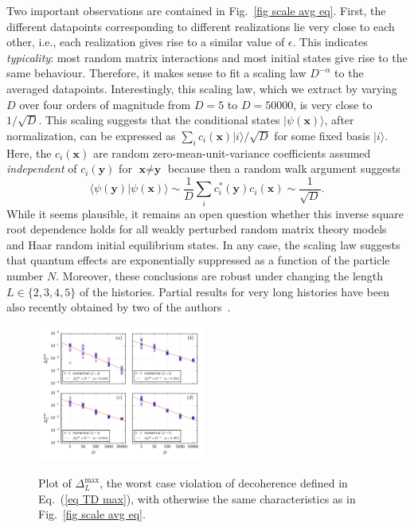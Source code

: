 \documentclass[pre,onecolumn,12pt,aps,longbibliography,nofootinbib]{revtex4-2}
\newcommand{\bb}[1]{\textbf{#1}}
\newcommand{\lr}[1]{{\langle {#1}\rangle}}
\newcommand{\new}[1]{#1}
\begin{document}
Two important observations are contained in Fig.~\ref{fig scale avg eq}. First, the different datapoints corresponding to different realizations lie very close to each other, i.e., each realization gives rise to a similar value of $\epsilon$. This indicates \emph{typicality}: most random matrix interactions and most initial states give rise to the same behaviour. Therefore, it makes sense to fit a scaling law $D^{-\alpha}$ to the averaged datapoints. Interestingly, this scaling law, which we extract by varying $D$ over four orders of magnitude from $D=5$ to $D=50000$, is very close to $1/\sqrt{D}$. \new{This scaling suggests that the conditional states $|\psi(\bb x)\rangle$, after normalization, can be expressed as $\sum_i c_i(\bb x)|i\rangle/\sqrt{D}$ for some fixed basis $|i\rangle$. Here, the $c_i(\bb x)$ are random zero-mean-unit-variance coefficients assumed \emph{independent} of $c_i(\bb y)$ for $\bb x\neq\bb y$ because then a random walk argument suggests
\begin{equation}
 \lr{\psi(\bb y)|\psi(\bb x)} \sim \frac{1}{D} \sum_i c_i^*(\bb y) c_i(\bb x) \sim \frac{1}{\sqrt{D}}.
\end{equation}
While it seems plausible, it remains an open question} whether this inverse square root dependence holds for all weakly perturbed random matrix theory models and Haar random initial equilibrium states. In any case, the scaling law suggests that quantum effects are exponentially suppressed as a function of the particle number $N$. Moreover, these conclusions are robust under changing the length $L\in\{2,3,4,5\}$ of the histories. \new{Partial results for very long histories have been also recently obtained by two of the authors~\cite{StrasbergSchindlerArXiv2023}.}

\begin{figure}[t]
 \centering\includegraphics[width=0.49\textwidth,clip=true]{Max_001_eq.pdf}
 \label{fig scale max eq}\vspace{-0.5cm}
 \caption{Plot of $\Delta_L^\text{max}$, the worst case violation of decoherence defined in Eq.~(\ref{eq TD max}), with otherwise the same characteristics as in Fig.~\ref{fig scale avg eq}.}
\end{figure}
\end{document}
